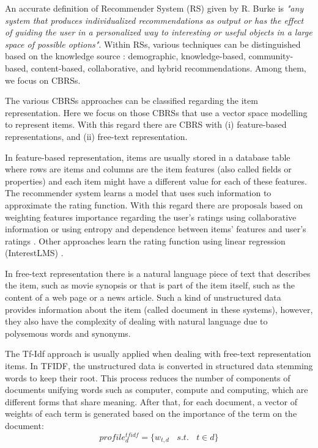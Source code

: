 \documentclass[preprint]{elsarticle}
\begin{document}
\begin{spacing}{1.5}
An accurate definition of Recommender System (RS) given by R. Burke \cite{Burke2002} is \emph{"any system that produces individualized recommendations as output or has the effect of guiding the user in a personalized way to interesting or useful objects in a large space of possible options"}. Within RSs, various techniques can be distinguished based on the knowledge source \cite{DePessemier2016}: demographic, knowledge-based, community-based, content-based, collaborative, and hybrid recommendations. Among them, we focus on CBRSs.

The various CBRSs approaches can be classified regarding the item representation. Here we focus on those CBRSs that use a vector space modelling to represent items. With this regard there are CBRS with (i) feature-based representations, and (ii) free-text representation.

In feature-based representation, items are usually stored in a database table where rows are items and columns are the item features (also called fields or properties) and each item might have a different value for each of these features. The recommender system learns a model that uses such information to approximate the rating function. With this regard there are proposals based on weighting features importance regarding the user's ratings using collaborative information \cite{Symeonidis2007} or using entropy and dependence between items' features and user's ratings \cite{Castro2014}. Other approaches learn the rating function using linear regression (InterestLMS) \cite{DePessemier2016}.

In free-text representation there is a natural language piece of text that describes the item, such as movie synopsis or that is part of the item itself, such as the content of a web page or a news article. Such a kind of unstructured data provides information about the item (called document in these systems), however, they also have the complexity of dealing with natural language due to polysemous words and synonyms. 

The Tf-Idf approach is usually applied when dealing with free-text representation items. In TFIDF, the unstructured data is converted in structured data stemming words \cite{Porter1980} to keep their root. This process reduces the number of components of documents unifying words such as computer, compute and computing, which are different forms that share meaning. After that, for each document, a vector of weights of each term is generated based on the importance of the term on the document:
\begin{equation}
	profile^{tfidf}_{d} = \{w_{t,d}~~~~s.t.~~~~ t \in d \}
	\label{eq:document-profile-tfidf}
\end{equation}


\end{spacing}
\end{document}
